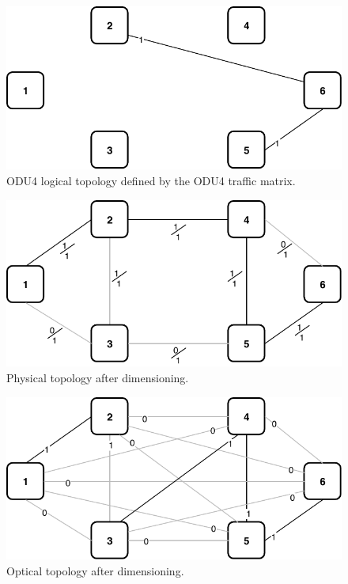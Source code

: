 \begin{figure}[h!]
\centering
\includegraphics[width=12cm]{sdf/ilp/translucent_survivability/figures/logical_topology_ODU4_low}
\caption{ODU4 logical topology defined by the ODU4 traffic matrix.}
\label{logical3_ODU4_low}
\end{figure}
\newpage
\begin{figure}[h!]
\centering
\includegraphics[width=12cm]{sdf/ilp/translucent_survivability/figures/physical_topology}
\caption{Physical topology after dimensioning.}
\label{physical3_low}
\end{figure}

\vspace{13pt}
\begin{figure}[h!]
\centering
\includegraphics[width=12cm]{sdf/ilp/translucent_survivability/figures/optical_topology_low}
\caption{Optical topology after dimensioning.}
\label{optical3_low}
\end{figure}

